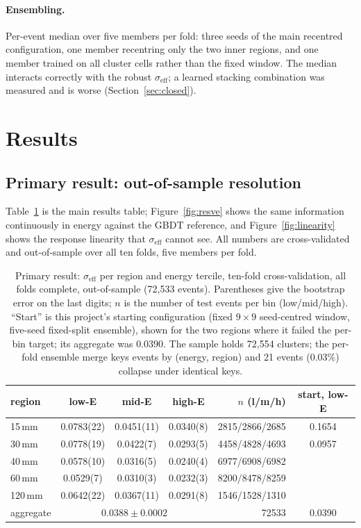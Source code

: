 \documentclass[11pt,a4paper]{article}
\newcommand{\seff}{\ensuremath{\sigma_{\mathrm{eff}}}}
\begin{document}
\paragraph{Ensembling.} Per-event median over five members per fold: three
seeds of the main recentred configuration, one member recentring only the
two inner regions, and one member trained on all cluster cells rather than
the fixed window. The median interacts correctly with the robust \seff; a
learned stacking combination was measured and is worse
(Section~\ref{sec:closed}).

\section{Results}

\subsection{Primary result: out-of-sample resolution}
\label{sec:primary}

Table~\ref{tab:primary} is the main results table; Figure~\ref{fig:resve} shows
the same information continuously in energy against the GBDT reference, and
Figure~\ref{fig:linearity} shows the response linearity that \seff{} cannot
see. All numbers are cross-validated and out-of-sample over all ten folds,
five members per fold.

\begin{table}[h]
\centering
\caption{Primary result: \seff{} per region and energy tercile, ten-fold
cross-validation, all folds complete, out-of-sample (72{,}533 events).
Parentheses give the bootstrap error on the last digits; $n$ is the number
of test events per bin (low/mid/high). ``Start'' is this project's starting
configuration (fixed $9{\times}9$ seed-centred window, five-seed fixed-split
ensemble), shown for the two regions where it failed the per-bin target; its
aggregate was $0.0390$. The sample holds 72{,}554 clusters; the per-fold
ensemble merge keys events by (energy, region) and 21 events ($0.03\%$)
collapse under identical keys.}
\label{tab:primary}
\small
\begin{tabular}{lcccrc}
\toprule
region & low-E & mid-E & high-E & $n$ (l/m/h) & start, low-E\\
\midrule
15\,mm  & 0.0783(22) & 0.0451(11) & 0.0340(8) & 2815/2866/2685 & 0.1654\\
30\,mm  & 0.0778(19) & 0.0422(7)  & 0.0293(5) & 4458/4828/4693 & 0.0957\\
40\,mm  & 0.0578(10) & 0.0316(5)  & 0.0240(4) & 6977/6908/6982 & \\
60\,mm  & 0.0529(7)  & 0.0310(3)  & 0.0232(3) & 8200/8478/8259 & \\
120\,mm & 0.0642(22) & 0.0367(11) & 0.0291(8) & 1546/1528/1310 & \\
\midrule
aggregate & \multicolumn{3}{c}{$0.0388 \pm 0.0002$} & 72533 & 0.0390\\
\bottomrule
\end{tabular}
\end{table}
\end{document}
